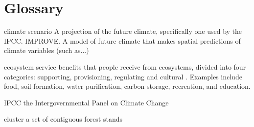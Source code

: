 
\chapter*{Glossary}      %
\thispagestyle{plain}
%
\begin{glossary}

\item[climate scenario] A projection of the future climate, specifically one used by the IPCC. IMPROVE. A model of future climate that makes spatial predictions of climate variables (such as...)

\item[ecosystem service] benefits that people receive from ecosystems, divided into four categories: supporting, provisioning, regulating and cultural \cite{assessment2005ecosystems}. Examples include food, soil formation, water purification, carbon storage, recreation, and education.

\item[IPCC] the Intergovernmental Panel on Climate Change

\item[cluster] a set of contiguous forest stands
 
\end{glossary}